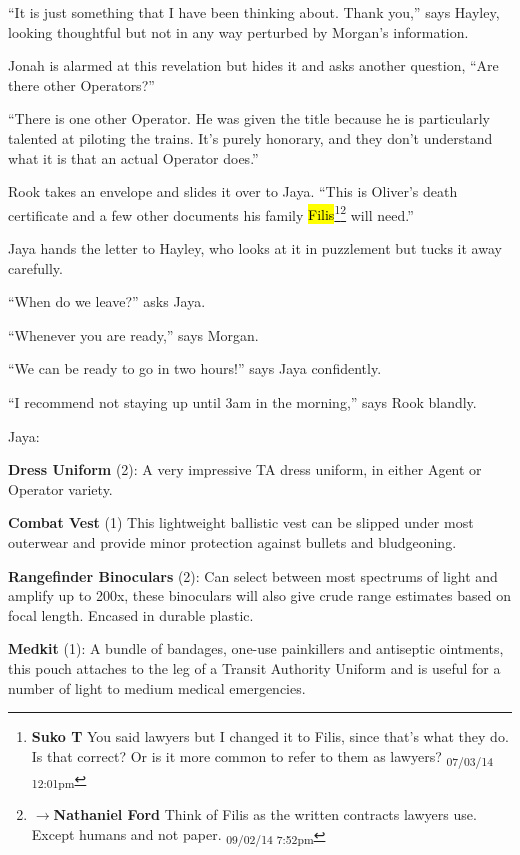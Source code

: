 ``It is just something that I have been thinking about.  Thank you,'' says Hayley, looking thoughtful but not in any way perturbed by Morgan's information.

Jonah is alarmed at this revelation but hides it and asks another question, ``Are there other Operators?''

``There is one other Operator.  He was given the title because he is particularly talented at piloting the trains.  It's purely honorary, and they don't understand what it is that an actual Operator does.''

Rook takes an envelope and slides it over to Jaya.  ``This is Oliver's death certificate and a few other documents his family \hl{Filis}\footnote{\textbf{Suko T }You said lawyers but I changed it to Filis, since that's what they do.  Is that correct?  Or is it more common to refer to them as lawyers? \textsubscript{07/03/14 12:01pm}}\footnote{$\rightarrow$\textbf{Nathaniel Ford }Think of Filis as the written contracts lawyers use. Except humans and not paper. \textsubscript{09/02/14 7:52pm}} will need.''

Jaya hands the letter to Hayley, who looks at it in puzzlement but tucks it away carefully.

``When do we leave?'' asks Jaya.

``Whenever you are ready,'' says Morgan.

``We can be ready to go in two hours!'' says Jaya confidently.

``I recommend not staying up until 3am in the morning,'' says Rook blandly.





Jaya:

\textbf{Dress Uniform} (2): A very impressive TA dress uniform, in either Agent or Operator variety.

\textbf{Combat Vest} (1) This lightweight ballistic vest can be slipped under most outerwear and provide minor protection against bullets and bludgeoning.

\textbf{Rangefinder Binoculars} (2): Can select between most spectrums of light and amplify up to 200x, these binoculars will also give crude range estimates based on focal length. Encased in durable plastic.

\textbf{Medkit} (1): A bundle of bandages, one-use painkillers and antiseptic ointments, this pouch attaches to the leg of a Transit Authority Uniform and is useful for a number of light to medium medical emergencies.

